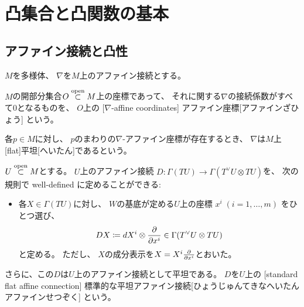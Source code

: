 \documentclass[report]{jlreq}
\begin{document}
%
\chapter{凸集合と凸関数の基本}

%
\section{アファイン接続と凸性}

$M$を多様体、
$\nabla$を$M$上のアファイン接続とする。

\begin{definition}[平坦アファイン接続]
    $M$の開部分集合$O \stackrel{\text{open}}{\subset} M$上の座標であって、
    それに関する$\nabla$の接続係数がすべて$0$となるものを、
    $O$上の
    [$\nabla$-affine coordinates]
        {アファイン座標}[アファインざひょう]
    という。

    各$p \in M$に対し、
    $p$のまわりの$\nabla$-アファイン座標が存在するとき、
    $\nabla$は$M$上
    [flat]{平坦}[へいたん]であるという。
\end{definition}

\begin{propdef}[$U$上の標準的な平坦アファイン接続]
    $U \stackrel{\text{open}}{\subset} M$とする。
    $U$上のアファイン接続
    $D \colon \Gamma(TU) \to \Gamma(T^\vee U \otimes TU)$を、
    次の規則で well-defined に定めることができる:
    \begin{itemize}
        \item 各$X \in \Gamma(TU)$に対し、
            $W$の基底が定める$U$上の座標
            $x^i \; (i = 1, \dots, m)$
            をひとつ選び、
            \begin{equation}
                \label{eq:def_connection_d}
                DX
                    \coloneqq dX^i \otimes \deldel{x^i}
                    \in \Gamma(T^\vee U \otimes TU)
            \end{equation}
            と定める。
            ただし、
            $X$の成分表示を$X = X^i \deldel{x^i}$とおいた。
    \end{itemize}
    さらに、この$D$は$U$上のアファイン接続として平坦である。
    $D$を$U$上の
    [standard flat affine connection]
        {標準的な平坦アファイン接続}[ひょうじゅんてきなへいたんアファインせつぞく]
    という。
\end{propdef}
\end{document}
